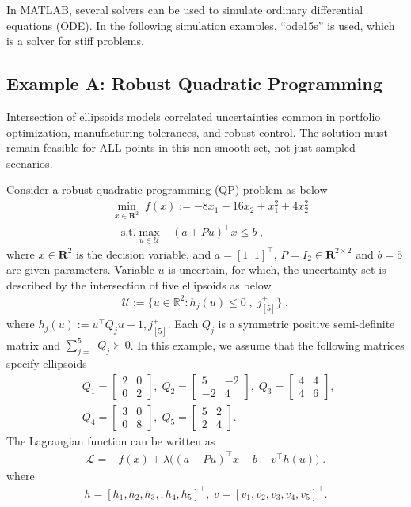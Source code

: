 \documentclass[journal,twoside,web]{ieeecolor}
\newcommand{\rev}[1]{\textcolor{revisionblue}{#1}}
\begin{document}
In MATLAB, several solvers can be used to simulate ordinary differential equations (ODE). In the following simulation examples, ``ode15s'' is used, which is a solver for stiff problems.

\subsection*{\rev{Example A: Robust Quadratic Programming}}

\rev{Intersection of ellipsoids models correlated uncertainties common in portfolio optimization, manufacturing tolerances, and robust control. The solution must remain feasible for ALL points in this non-smooth set, not just sampled scenarios.}

Consider a robust quadratic programming (QP) problem as below
\begin{align} \label{ro_simulation}
&\min_{x \in \mathbf{R}^2} \;f(x):=-8x_1-16x_2+x_1^2+4x_2^2\nonumber\\
&\;\;\;\text{s.t.} \max_{u\in \mathcal{U}} \;\;\; (a+Pu)^\top x\leq b\;,
\end{align}
where $x \in \mathbf{R}^2$ is the decision variable, and $a =[1\;\;1]^\top$, $P=I_2 \in \mathbf{R}^{2 \times 2}$ and $b=5$ are given parameters. Variable $u$ is uncertain, for which, the uncertainty set is described by the intersection of five ellipsoids as below
\begin{align*}\mathcal{U}:=\{u \in \mathbb{R}^{2}:h_{j}(u) \leq 0\;,\; j^+_{[5]}\}\;,\end{align*}
where
$h_j(u):=u^\top Q_j u-1, j^+_{[5]}$. Each $Q_{j}$ is a symmetric positive semi-definite matrix and $ \sum_{j=1}^{5} Q_j \succ 0$. In this example, we assume that the following matrices specify ellipsoids
\begin{align*}
&Q_1=\left[\begin{array}{ccl} 2 & 0\\0 & 2 \end{array}\right],\; Q_2=\left[\begin{array}{ccl} 5 & -2\\-2 & 4  \end{array}\right],\; Q_3=\left[\begin{array}{ccl} 4 & 4\\4 & 6\end{array}\right],\;\\
&Q_4=\left[\begin{array}{ccl} 3 & 0\\0 & 8 \end{array}\right],\;
Q_5=\left[\begin{array}{ccl} 5 & 2\\2 & 4 \end{array}\right].
\end{align*}
The Lagrangian function can be written as
\begin{align*}
\mathcal{L}=&f(x)+\lambda \big((a+Pu)^\top x-b-v ^\top h(u)\big)\;.
\end{align*}
where
\begin{align*}
h=[h_1,h_2,h_3,,h_4,h_5]^\top ,\ v=[v_1,v_2,v_3,v_4,v_5]^\top.
\end{align*}
\end{document}
